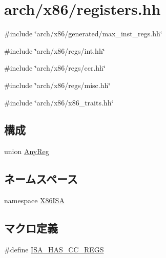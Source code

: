 \hypertarget{x86_2registers_8hh}{
\section{arch/x86/registers.hh}
\label{x86_2registers_8hh}
}
{\ttfamily \#include \char`\"{}arch/x86/generated/max\_\-inst\_\-regs.hh\char`\"{}}\par
{\ttfamily \#include \char`\"{}arch/x86/regs/int.hh\char`\"{}}\par
{\ttfamily \#include \char`\"{}arch/x86/regs/ccr.hh\char`\"{}}\par
{\ttfamily \#include \char`\"{}arch/x86/regs/misc.hh\char`\"{}}\par
{\ttfamily \#include \char`\"{}arch/x86/x86\_\-traits.hh\char`\"{}}\par
\subsection*{構成}
\begin{DoxyCompactItemize}
\item 
union \hyperlink{unionX86ISA_1_1AnyReg}{AnyReg}
\end{DoxyCompactItemize}
\subsection*{ネームスペース}
\begin{DoxyCompactItemize}
\item 
namespace \hyperlink{namespaceX86ISA}{X86ISA}
\end{DoxyCompactItemize}
\subsection*{マクロ定義}
\begin{DoxyCompactItemize}
\item 
\#define \hyperlink{x86_2registers_8hh_a15bbbb5d491837c952e0b0a3a2317315}{ISA\_\-HAS\_\-CC\_\-REGS}
\end{DoxyCompactItemize}
